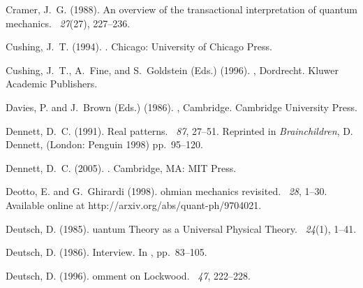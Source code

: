\documentclass[12pt]{article}
\begin{document}
\begin{thebibliography}{}
Cramer, J.~G. (1988).
\newblock An overview of the transactional interpretation of quantum mechanics.
~{\em 27\/}(27),
  227--236.

Cushing, J.~T. (1994).
.
\newblock Chicago: University of Chicago Press.

Cushing, J.~T., A.~Fine, and S.~Goldstein (Eds.) (1996).
, Dordrecht.
  Kluwer Academic Publishers.

Davies, P. and J.~Brown (Eds.) (1986).
, Cambridge. Cambridge University Press.

Dennett, D.~C. (1991).
\newblock Real patterns.
~{\em 87}, 27--51.
\newblock Reprinted in \textit{Brainchildren}, D.\, Dennett, (London: Penguin
  1998) pp.\, 95--120.

Dennett, D.~C. (2005).
.
\newblock Cambridge, MA: MIT Press.

Deotto, E. and G.~Ghirardi (1998).
ohmian mechanics revisited.
~{\em 28}, 1--30.
\newblock Available online at http://arxiv.org/abs/quant-ph/9704021.

Deutsch, D. (1985).
uantum {T}heory as a {U}niversal {P}hysical {T}heory.
~{\em 24\/}(1),
  1--41.

Deutsch, D. (1986).
\newblock Interview.
\newblock In , pp.\  83--105.

Deutsch, D. (1996).
omment on {L}ockwood.
~{\em 47},
  222--228.


\end{thebibliography}
\end{document}
